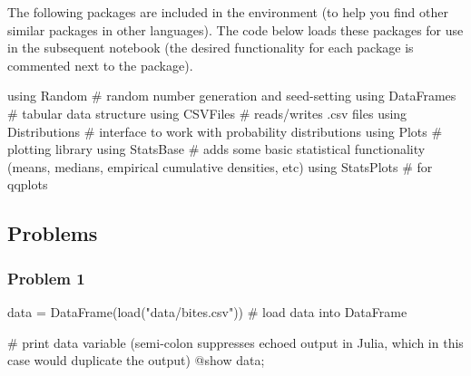\documentclass[
  letterpaper,
  DIV=11,
  numbers=noendperiod]{scrartcl}
\newenvironment{Shaded}{\begin{snugshade}}{\end{snugshade}}
\newcommand{\BuiltInTok}[1]{\textcolor[rgb]{0.00,0.23,0.31}{#1}}
\newcommand{\CommentTok}[1]{\textcolor[rgb]{0.37,0.37,0.37}{#1}}
\newcommand{\FunctionTok}[1]{\textcolor[rgb]{0.28,0.35,0.67}{#1}}
\newcommand{\ImportTok}[1]{\textcolor[rgb]{0.00,0.46,0.62}{#1}}
\newcommand{\NormalTok}[1]{\textcolor[rgb]{0.00,0.23,0.31}{#1}}
\newcommand{\OperatorTok}[1]{\textcolor[rgb]{0.37,0.37,0.37}{#1}}
\newcommand{\PreprocessorTok}[1]{\textcolor[rgb]{0.68,0.00,0.00}{#1}}
\newcommand{\StringTok}[1]{\textcolor[rgb]{0.13,0.47,0.30}{#1}}
\begin{document}
The following packages are included in the environment (to help you find
other similar packages in other languages). The code below loads these
packages for use in the subsequent notebook (the desired functionality
for each package is commented next to the package).

\begin{Shaded}
\begin{Highlighting}[]
\ImportTok{using} \BuiltInTok{Random }\CommentTok{\# random number generation and seed{-}setting}
\ImportTok{using} \BuiltInTok{DataFrames }\CommentTok{\# tabular data structure}
\ImportTok{using} \BuiltInTok{CSVFiles }\CommentTok{\# reads/writes .csv files}
\ImportTok{using} \BuiltInTok{Distributions }\CommentTok{\# interface to work with probability distributions}
\ImportTok{using} \BuiltInTok{Plots }\CommentTok{\# plotting library}
\ImportTok{using} \BuiltInTok{StatsBase }\CommentTok{\# adds some basic statistical functionality (means, medians, empirical cumulative densities, etc)}
\ImportTok{using} \BuiltInTok{StatsPlots }\CommentTok{\# for qqplots}
\end{Highlighting}
\end{Shaded}

\subsection{Problems}\label{problems}

\subsubsection{Problem 1}\label{problem-1}

\begin{Shaded}
\begin{Highlighting}[]
\NormalTok{data }\OperatorTok{=} \FunctionTok{DataFrame}\NormalTok{(}\FunctionTok{load}\NormalTok{(}\StringTok{"data/bites.csv"}\NormalTok{)) }\CommentTok{\# load data into DataFrame}

\CommentTok{\# print data variable (semi{-}colon suppresses echoed output in Julia, which in this case would duplicate the output)}
\PreprocessorTok{@show}\NormalTok{ data; }
\end{Highlighting}
\end{Shaded}
\end{document}

